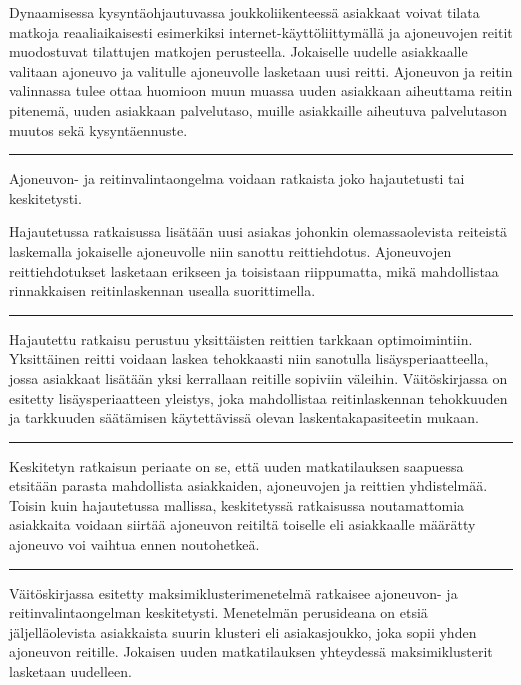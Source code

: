 \documentclass[a4paper,12pt]{article}
\newcommand*\sepline{%
  \begin{center}
    \rule[1ex]{.5\textwidth}{.5pt}
  \end{center}}
\begin{document}

Dynaamisessa kysyntäohjautuvassa joukkoliikenteessä asiakkaat voivat tilata matkoja reaaliaikaisesti esimerkiksi internet-käyttöliittymällä ja 
ajoneuvojen reitit muodostuvat tilattujen matkojen perusteella. Jokaiselle uudelle asiakkaalle valitaan ajoneuvo ja 
valitulle ajoneuvolle lasketaan uusi reitti. Ajoneuvon ja reitin valinnassa tulee ottaa huomioon muun muassa 
uuden asiakkaan aiheuttama reitin pitenemä, uuden asiakkaan palvelutaso, muille asiakkaille aiheutuva palvelutason muutos sekä kysyntäennuste.

\sepline

Ajoneuvon- ja reitinvalintaongelma voidaan ratkaista joko hajautetusti tai keskitetysti. 

Hajautetussa ratkaisussa lisätään uusi asiakas johonkin olemassaolevista reiteistä laskemalla jokaiselle 
ajoneuvolle niin sanottu reittiehdotus. Ajoneuvojen reittiehdotukset lasketaan erikseen ja toisistaan riippumatta, 
mikä mahdollistaa rinnakkaisen reitinlaskennan usealla suorittimella. %

\sepline

Hajautettu ratkaisu perustuu yksittäisten reittien tarkkaan optimoimintiin. Yksittäinen reitti voidaan laskea
tehokkaasti niin sanotulla lisäysperiaatteella, jossa asiakkaat lisätään yksi kerrallaan reitille sopiviin väleihin. 
Väitöskirjassa on esitetty lisäysperiaatteen yleistys, joka mahdollistaa reitinlaskennan tehokkuuden ja tarkkuuden 
säätämisen käytettävissä olevan laskentakapasiteetin mukaan. 

\sepline

Keskitetyn ratkaisun periaate on se, että uuden matkatilauksen saapuessa etsitään parasta mahdollista asiakkaiden, 
ajoneuvojen ja reittien yhdistelmää. Toisin kuin hajautetussa mallissa, keskitetyssä ratkaisussa noutamattomia asiakkaita voidaan siirtää
ajoneuvon reitiltä toiselle eli asiakkaalle määrätty ajoneuvo voi vaihtua ennen noutohetkeä. 

\sepline

Väitöskirjassa esitetty maksimiklusterimenetelmä ratkaisee ajoneuvon- ja reitinvalintaongelman keskitetysti. 
Menetelmän perusideana on etsiä jäljelläolevista asiakkaista suurin klusteri eli asiakasjoukko, joka sopii yhden ajoneuvon reitille. 
Jokaisen uuden matkatilauksen yhteydessä maksimiklusterit lasketaan uudelleen.
\end{document}
